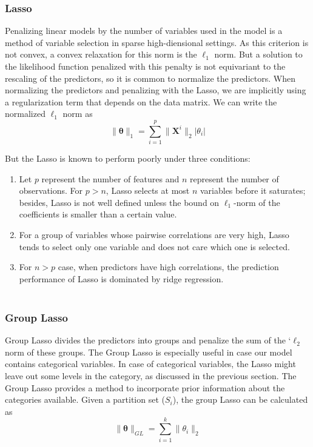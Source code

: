 \documentclass[11pt]{article}
\begin{document}
\subsubsection{Lasso}

Penalizing linear models by the number of variables used in the model is a method of variable selection in sparse high-diensional settings. 
As this criterion is not convex, a convex relaxation for this norm is the $\ell_1$ norm. 
But a solution to the likelihood function penalized with this penalty is not equivariant to the rescaling of the predictors, so it is common to normalize the predictors. 
When normalizing the predictors and penalizing with the Lasso, we are implicitly using a regularization term that depends on the data matrix. 
We can write the normalized $\ell_1$ norm as 
$$ \|\mathbf{\theta}\|_1 = \sum \limits_{i=1}^p \|{\mathbf{X}^i}\|_2 |\theta_i| $$ 

But the Lasso is known to perform poorly under three conditions:

\begin{enumerate} 

\item

Let $p$ represent the number of features and $n$ represent the number of observations. For $p>n$, Lasso selects at most $n$ variables before it saturates; besides, Lasso is not well defined unless the bound on $\ell_1$-norm of the coefficients is smaller than a certain value.
\item

For a group of variables whose pairwise correlations are very high, Lasso tends to select only one variable and does not care which one is selected.

\item

 For $n>p$ case, when predictors have high correlations, the prediction performance of Lasso is dominated by ridge regression.\\ \\
 \end{enumerate}


\subsubsection{Group Lasso}

Group Lasso divides the predictors into groups and penalize the sum of the `$\ell_2$ norm of these groups.
The Group Lasso is especially useful in case our model contains categorical variables. 
In case of categorical variables, the Lasso might leave out some levels in the category, as discussed in the previous section. 
The Group Lasso provides a method to incorporate prior information about the categories available.
Given a partition set ($S_i$), the group Lasso can be calculated as
$$ \|\mathbf{\theta}\|_{GL} = \sum \limits_{i=1}^k \|\theta_i\|_2 $$
\end{document}
